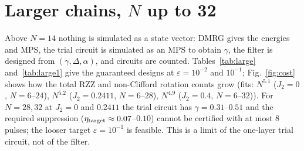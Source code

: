 \documentclass[11pt]{article}
\begin{document}
\section{Larger chains, $N$ up to 32}\label{sec:large}
Above $N=14$ nothing is simulated as a state vector: DMRG gives the energies and MPS, the trial circuit is simulated as an MPS to obtain $\gamma$, the filter is designed from $(\gamma,\Delta,\alpha)$, and circuits are counted. Tables~\ref{tab:large} and~\ref{tab:large1} give the guaranteed designs at $\varepsilon=10^{-2}$ and $10^{-1}$; Fig.~\ref{fig:cost} shows how the total RZZ and non-Clifford rotation counts grow (fits: $N^{5.1}$ ($J_2=0$, $N=6$--$24$), $N^{5.2}$ ($J_2=0.2411$, $N=6$--$28$), $N^{4.9}$ ($J_2=0.4$, $N=6$--$32$)). For $N=28,32$ at $J_2=0$ and $0.2411$ the trial circuit has $\gamma=0.31$--$0.51$ and the required suppression ($\eta_{\rm target}\approx0.07$--$0.10$) cannot be certified with at most 8 pulses; the looser target $\varepsilon=10^{-1}$ is feasible. This is a limit of the one-layer trial circuit, not of the filter.
\end{document}
